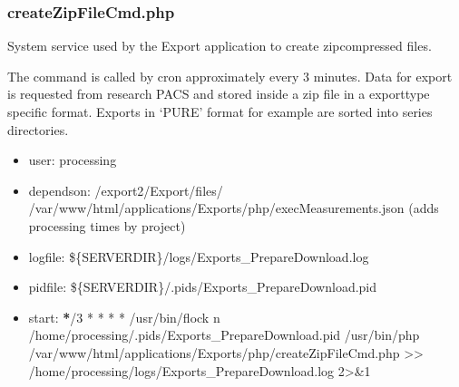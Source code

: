 \documentclass[letterpaper,10pt,english]{sphinxmanual}
\begin{document}
\sphinxstepscope


\subsubsection{createZipFileCmd.php}
\label{\detokenize{Architecture/scripts/createZipFileCmd:createzipfilecmd-php}}\label{\detokenize{Architecture/scripts/createZipFileCmd::doc}}
\sphinxAtStartPar
System service used by the Export application to create zip\sphinxhyphen{}compressed files.

\sphinxAtStartPar
The command is called by cron approximately every 3 minutes. Data for export is requested from research PACS and
stored inside a zip file in a export\sphinxhyphen{}type specific format. Exports in ‘PURE’ format for example are sorted into
series directories.
\begin{itemize}
\item {} 
\sphinxAtStartPar
user: processing

\item {} 
\sphinxAtStartPar
depends\sphinxhyphen{}on:
\sphinxhyphen{} /export2/Export/files/
\sphinxhyphen{} /var/www/html/applications/Exports/php/execMeasurements.json (adds processing times by project)

\item {} 
\sphinxAtStartPar
log\sphinxhyphen{}file:
\sphinxhyphen{} \$\{SERVERDIR\}/logs/Exports\_PrepareDownload.log

\item {} 
\sphinxAtStartPar
pid\sphinxhyphen{}file: \$\{SERVERDIR\}/.pids/Exports\_PrepareDownload.pid

\item {} 
\sphinxAtStartPar
start:
{\color{red}\bfseries{}*}/3 * * * * /usr/bin/flock \sphinxhyphen{}n /home/processing/.pids/Exports\_PrepareDownload.pid /usr/bin/php /var/www/html/applications/Exports/php/createZipFileCmd.php \textgreater{}\textgreater{} /home/processing/logs/Exports\_PrepareDownload.log 2\textgreater{}\&1

\end{itemize}

\sphinxstepscope
\end{document}
